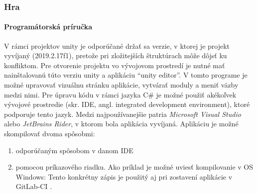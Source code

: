 \subsubsection{Hra}

\paragraph{Programátorská príručka}
V rámci projektov unity je odporúčané držať sa verzie, v ktorej je projekt vyvíjaný (2019.2.17f1), pretože pri
zložitejších štruktúrach môže dôjsť ku konfliktom.
Pre otvorenie projektu vo vývojovom prostredí je nutné mať nainštalovanú túto verziu unity a aplikáciu
\enquote{unity editor}.
V tomto programe je možné upravovať vizuálnu stránku aplikácie, vytvárať moduly a meniť väzby medzi nimi.
Pre úpravu kódu v rámci jazyka C\# je možné použiť akékoľvek vývojové prostredie (skr. IDE, angl. integrated development
environment), ktoré podporuje tento jazyk.
Medzi najpoužívanejšie patria \emph{Microsoft Visual Studio} alebo \emph{JetBrains Rider}, v ktorom bola aplikácia
vyvíjaná.
Aplikáciu je možné skompilovať dvoma spôsobmi:
\begin{enumerate}
    \item odporúčaným spôsobom v danom IDE
    \item pomocou príkazového riadku.
    Ako príklad je možné uviesť kompilovanie v OS Windows:
    Tento konkrétny zápis je použitý aj pri zostavení aplikácie v GitLab-CI .
\end{enumerate}

